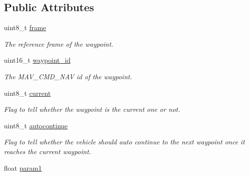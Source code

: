 \subsection*{Public Attributes}
\begin{DoxyCompactItemize}
\item 
\hypertarget{structwaypoint__struct_ab68745ce248758f012589770cdda6f4e}{uint8\+\_\+t \hyperlink{structwaypoint__struct_ab68745ce248758f012589770cdda6f4e}{frame}}\label{structwaypoint__struct_ab68745ce248758f012589770cdda6f4e}

\begin{DoxyCompactList}\small\item\em The reference frame of the waypoint. \end{DoxyCompactList}\item 
\hypertarget{structwaypoint__struct_a49e9e6afb6b32c53442d5d3f1f85bca1}{uint16\+\_\+t \hyperlink{structwaypoint__struct_a49e9e6afb6b32c53442d5d3f1f85bca1}{waypoint\+\_\+id}}\label{structwaypoint__struct_a49e9e6afb6b32c53442d5d3f1f85bca1}

\begin{DoxyCompactList}\small\item\em The M\+A\+V\+\_\+\+C\+M\+D\+\_\+\+N\+A\+V id of the waypoint. \end{DoxyCompactList}\item 
\hypertarget{structwaypoint__struct_ae2347ccf1efced0c168ec7bdab5b9636}{uint8\+\_\+t \hyperlink{structwaypoint__struct_ae2347ccf1efced0c168ec7bdab5b9636}{current}}\label{structwaypoint__struct_ae2347ccf1efced0c168ec7bdab5b9636}

\begin{DoxyCompactList}\small\item\em Flag to tell whether the waypoint is the current one or not. \end{DoxyCompactList}\item 
\hypertarget{structwaypoint__struct_a3b075297126848c55e83f9c60e1a0441}{uint8\+\_\+t \hyperlink{structwaypoint__struct_a3b075297126848c55e83f9c60e1a0441}{autocontinue}}\label{structwaypoint__struct_a3b075297126848c55e83f9c60e1a0441}

\begin{DoxyCompactList}\small\item\em Flag to tell whether the vehicle should auto continue to the next waypoint once it reaches the current waypoint. \end{DoxyCompactList}\item 
\hypertarget{structwaypoint__struct_a23683fcdc506568d0e775220b2a7e83f}{float \hyperlink{structwaypoint__struct_a23683fcdc506568d0e775220b2a7e83f}{param1}}\label{structwaypoint__struct_a23683fcdc506568d0e775220b2a7e83f}


\end{DoxyCompactItemize}

